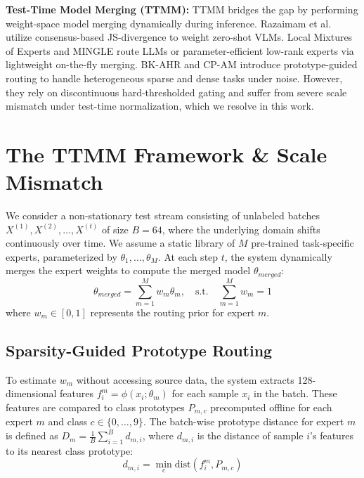 \documentclass{article}
\theoremstyle{plain}
\theoremstyle{definition}
\theoremstyle{remark}
\begin{document}
\textbf{Test-Time Model Merging (TTMM):} TTMM bridges the gap by performing weight-space model merging dynamically during inference. Razaimam et al. \cite{razaimam2025t3} utilize consensus-based JS-divergence to weight zero-shot VLMs. Local Mixtures of Experts \cite{bertolissi2025local} and MINGLE \cite{qiu2025mingle} route LLMs or parameter-efficient low-rank experts via lightweight on-the-fly merging. BK-AHR \cite{anonymous} and CP-AM \cite{anonymous} introduce prototype-guided routing to handle heterogeneous sparse and dense tasks under noise. However, they rely on discontinuous hard-thresholded gating and suffer from severe scale mismatch under test-time normalization, which we resolve in this work.

\section{The TTMM Framework \& Scale Mismatch}
\label{sec:background}

We consider a non-stationary test stream consisting of unlabeled batches $X^{(1)}, X^{(2)}, \dots, X^{(t)}$ of size $B=64$, where the underlying domain shifts continuously over time. We assume a static library of $M$ pre-trained task-specific experts, parameterized by $\theta_1, \dots, \theta_M$. At each step $t$, the system dynamically merges the expert weights to compute the merged model $\theta_{merged}$:
\begin{equation}
    \theta_{merged} = \sum_{m=1}^M w_m \theta_m, \quad \text{s.t.} \quad \sum_{m=1}^M w_m = 1
\end{equation}
where $w_m \in [0, 1]$ represents the routing prior for expert $m$.

\subsection{Sparsity-Guided Prototype Routing}

To estimate $w_m$ without accessing source data, the system extracts 128-dimensional features $f^m_i = \phi(x_i; \theta_m)$ for each sample $x_i$ in the batch. These features are compared to class prototypes $P_{m, c}$ precomputed offline for each expert $m$ and class $c \in \{0, \dots, 9\}$. The batch-wise prototype distance for expert $m$ is defined as $D_m = \frac{1}{B} \sum_{i=1}^B d_{m, i}$, where $d_{m, i}$ is the distance of sample $i$'s features to its nearest class prototype:
\begin{equation}
    d_{m, i} = \min_{c} \text{dist}(f^m_i, P_{m, c})
\end{equation}
\end{document}
